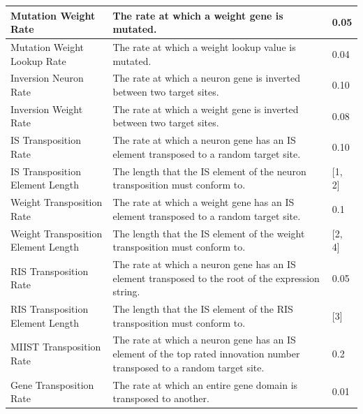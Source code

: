 \begin{xltabular}{\textwidth}{|l|X|l|}
Mutation Weight Rate                & The rate at which a weight gene is mutated.                                                                               & 0.05                   \\ \hline
Mutation Weight Lookup Rate         & The rate at which a weight lookup value is mutated.                                                                       & 0.04                   \\ \hline
Inversion Neuron Rate               & The rate at which a neuron gene is inverted between two target sites.                                                     & 0.10                   \\ \hline
Inversion Weight Rate               & The rate at which a weight gene is inverted between two target sites.                                                     & 0.08                   \\ \hline
IS Transposition Rate               & The rate at which a neuron gene has an IS element transposed to a random target site.                                     & 0.10                   \\ \hline
IS Transposition Element Length     & The length that the IS element of the neuron transposition must conform to.                                               & {[}1, 2{]}             \\ \hline
Weight Transposition Rate           & The rate at which a weight gene has an IS element transposed to a random target site.                                     & 0.1                    \\ \hline
Weight Transposition Element Length & The length that the IS element of the weight transposition must conform to.                                               & {[}2, 4{]}             \\ \hline
RIS Transposition Rate              & The rate at which a neuron gene has an IS element transposed to the root of the expression string.                        & 0.05                   \\ \hline
RIS Transposition Element Length    & The length that the IS element of the RIS transposition must conform to.                                                  & {[}3{]}                \\ \hline
MIIST Transposition Rate            & The rate at which a neuron gene has an IS element of the top rated innovation number transposed to a random target site.  & 0.2                    \\ \hline
Gene Transposition Rate             & The rate at which an entire gene domain is transposed to another.                                                         & 0.01                   \\ \hline

\end{xltabular}

